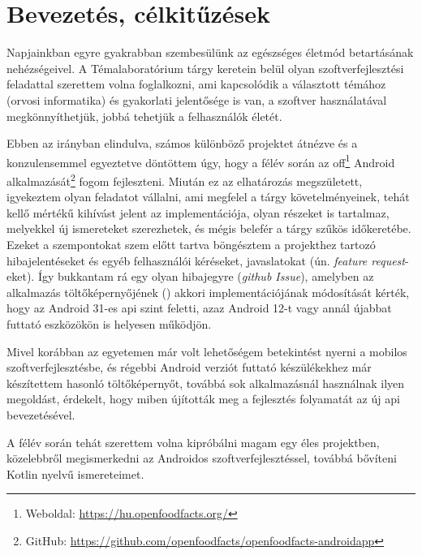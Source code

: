 \chapter{Bevezetés, célkitűzések}
Napjainkban egyre gyakrabban szembesülünk az egészséges életmód betartásának nehézségeivel.
A Témalaboratórium tárgy keretein belül olyan szoftverfejlesztési feladattal szerettem volna
foglalkozni, ami kapcsolódik a választott témához (orvosi informatika) és gyakorlati
jelentősége is van, a szoftver használatával megkönnyíthetjük, jobbá tehetjük a felhasználók életét.

Ebben az irányban elindulva, számos különböző projektet átnézve és a konzulensemmel egyeztetve
döntöttem úgy, hogy a félév során az \acrlong{off}\footnote{Weboldal: \url{https://hu.openfoodfacts.org/}}
Android alkalmazását\footnote{GitHub: \url{https://github.com/openfoodfacts/openfoodfacts-androidapp}} fogom fejleszteni.
Miután ez az elhatározás megszületett, igyekeztem olyan feladatot vállalni,
ami megfelel a tárgy követelményeinek, tehát kellő mértékű kihívást jelent
az implementációja, olyan részeket is tartalmaz, melyekkel új ismereteket szerezhetek, és mégis
belefér a tárgy szűkös időkeretébe. Ezeket a szempontokat szem előtt tartva böngésztem a
projekthez tartozó hibajelentéseket és egyéb felhasználói kéréseket, javaslatokat (ún. \textit{feature request}-eket).
Így bukkantam rá egy olyan hibajegyre (\textit{\gls{github} Issue}), amelyben az alkalmazás
töltőképernyőjének () akkori implementációjának módosítását kérték, hogy
az Android 31-es \acrshort{api} szint feletti, azaz Android 12-t vagy annál újabbat futtató eszközökön
is helyesen működjön. \cite{issue}

Mivel korábban az egyetemen már volt lehetőségem betekintést nyerni a mobilos szoftverfejlesztésbe,
és régebbi Android verziót futtató készülékekhez már készítettem hasonló töltőképernyőt, továbbá
sok alkalmazásnál használnak ilyen megoldást, érdekelt, hogy miben újították meg a fejlesztés
folyamatát az új \acrshort{api} bevezetésével.

A félév során tehát szerettem volna kipróbálni magam egy éles projektben, közelebbről megismerkedni
az Androidos szoftverfejlesztéssel, továbbá bővíteni Kotlin nyelvű ismereteimet.
